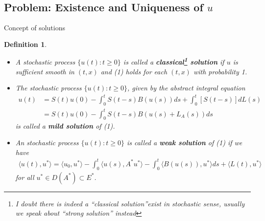 \documentclass[xcolor=dvipsnames,leqno]{beamer}
\newtheorem{defn}{Definition}
\begin{document}
\subsection{Problem: Existence and Uniqueness of $u$}
\begin{frame}[shrink=10]{Concept of solutions}
\begin{defn}
	\begin{itemize}
		\item A stochastic process $\{u(t): t\geq 0\}$ is called a \textbf{classical\footnote{I doubt there is indeed a ``classical solution''exist in stochastic sense, usually we speak about ``strong solution'' instead} solution} if $u$ is sufficient smooth in $(t, x)$ and (1) holds for  each $(t, x)$ with probability 1.
		\item The stochastic process $\{u(t): t\geq 0\}$, given by the abstract integral equation	   
			\begin{align*}
				u(t)&=S(t)u(0)-\int_{0}^{t} S(t-s)B(u(s))ds+\int_{0}^{t}[S(t-s)]dL(s)\\
				&=S(t)u(0)-\int_{0}^{t}S(t-s)B(u(s)+L_{A}(s))ds
			\end{align*}
		 is called a \textbf{mild solution} of (1).%
		\item An stochastic process $\{u(t): t\geq 0\}$ is called a \textbf{weak solution} of (1) if we have%
		\begin{align*}
			\langle u(t),u^{*}\rangle=\langle u_{0},u^{*}\rangle-\int_{0}^{t}\langle u(s), A^{*}u^{*}\rangle-\int_{0}^{t}\langle B(u(s)),u^{*}\rangle ds+\langle L(t),u^{*}\rangle
		\end{align*}	
		for all $u^{*}\in D(A^{*})\subset E^{*}$. %
	\end{itemize}
\end{defn}
\end{frame}   
\end{document}
